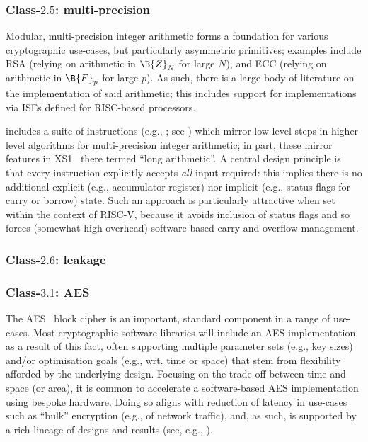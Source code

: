 
\subsubsection{Class-$2.5$: multi-precision}
\label{sec:bg:feature:2:5}

Modular, multi-precision integer arithmetic forms a foundation for various
cryptographic use-cases, but particularly asymmetric primitives; examples 
include
RSA (relying on arithmetic in $\B{Z}_N$ for large $N$),
and
ECC (relying on arithmetic in $\B{F}_p$ for large $p$).
As such, there is a large body of literature on the implementation of said 
arithmetic; this includes support for implementations via ISEs defined for 
RISC-based processors.

\XCRYPTO includes a suite of instructions 
(e.g., ; see )
which mirror low-level steps in higher-level algorithms for multi-precision 
integer arithmetic; in part, these mirror features in 
XS1~\cite[Section 18]{SCARV:XS1:09} 
there termed ``long arithmetic''.  A central design principle is that every
instruction explicitly accepts {\em all} input required: this implies there
is no additional
explicit (e.g., accumulator register) 
nor 
implicit (e.g., status flags for carry or borrow)
state.
Such an approach is particularly attractive when set within the context of 
RISC-V, because it avoids inclusion of status flags and so forces (somewhat 
high overhead) software-based carry and overflow management.


\subsubsection{Class-$2.6$: leakage}
\label{sec:bg:feature:2:6}



\subsubsection{Class-$3.1$: AES}
\label{sec:bg:feature:3:1}

The 
AES~\cite{SCARV:FIPS:197} 
block cipher is an important, standard component in a range of use-cases.  
Most cryptographic software libraries will include an AES implementation 
as a result of this fact, often supporting multiple 
parameter sets     (e.g., key sizes)
and/or
optimisation goals (e.g., wrt. time or space)
that stem from flexibility afforded by the underlying design.
Focusing on the trade-off between time and space (or area), it is common
to accelerate a software-based AES implementation using bespoke hardware.
Doing so aligns with reduction of latency in use-cases such as ``bulk''
encryption (e.g., of network traffic), and, as such, is supported by a
rich lineage of designs and results (see, e.g., ).

